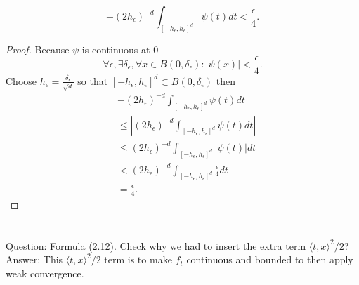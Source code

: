 \documentclass[a4paper,11pt]{article}
\begin{document}
\begin{equation}
    - ( 2 h_{\epsilon} )^{-d} \int_{[-h_{\epsilon}, h_{\epsilon} ]^{d}} \psi( t ) d t < \frac{\epsilon}{4}.
\end{equation}

\begin{proof}
    Because $\psi$ is continuous at $0$
    \begin{equation}
        \forall \epsilon, \exists \delta_{\epsilon}, \forall x \in B(0, \delta_{\epsilon}): |\psi(x)|<\frac{\epsilon}{4}
        .
    \end{equation}
    Choose $h_{\epsilon} = \frac{\delta_{\epsilon}}{\sqrt{d}}$ so that $[-h_{\epsilon},h_{\epsilon}]^{d} \subset B(0, \delta_{\epsilon})  $  then
    \begin{align}
         & -( 2 h_{\epsilon} )^{-d} \int_{[-h_{\epsilon}, h_{\epsilon} ]^{d}} \psi( t ) d t                   \\
         & \le \left|( 2 h_{\epsilon} )^{-d} \int_{[-h_{\epsilon}, h_{\epsilon} ]^{d}} \psi( t ) d t  \right| \\
         & \le ( 2 h_{\epsilon} )^{-d} \int_{[-h_{\epsilon}, h_{\epsilon} ]^{d}} \left|\psi( t )\right| d t   \\
         & < ( 2 h_{\epsilon} )^{-d} \int_{[-h_{\epsilon}, h_{\epsilon} ]^{d}} \frac{\epsilon}{4}d t          \\
         & = \frac{\epsilon}{4}.
    \end{align}
\end{proof}

\section{}
Question:  Formula (2.12). Check why we had to insert the extra term $ \langle t, x \rangle^{2} / 2 $? \\
Answer: This $ \langle t, x \rangle^{2} / 2 $ term is to make $f_t$ continuous and bounded to then apply weak convergence.
\end{document}
